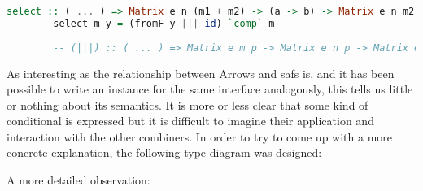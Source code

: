 \documentclass[
  oneside,
  11pt, a4paper,
  footinclude=true,
  headinclude=true,
  cleardoublepage=empty
]{scrbook}
\theoremstyle{definition}
\theoremstyle{definition}
\begin{document}
        \begin{lstlisting}[language=Haskell, label={lst:safm}, caption={LAoP Selective instance},captionpos=b]
        select :: ( ... ) => Matrix e n (m1 + m2) -> (a -> b) -> Matrix e n m2
        select m y = (fromF y ||| id) `comp` m
            
        -- (|||) :: ( ... ) => Matrix e m p -> Matrix e n p -> Matrix e (m + n) p
        \end{lstlisting}{}
        
        As interesting as the relationship between Arrows and \gls{saf}s is, and it has been possible to write an instance for the same interface analogously, this tells us little or nothing about its semantics. It is more or less clear that some kind of conditional is expressed but it is difficult to imagine their application and interaction with the other combiners. In order to try to come up with a more concrete explanation, the following type diagram was designed:
        
        \vskip0.2cm
        
        \begin{center}
        \end{center}
        
        A more detailed observation:
        
        \begin{center}
        \end{center}{}
        
\end{document}
